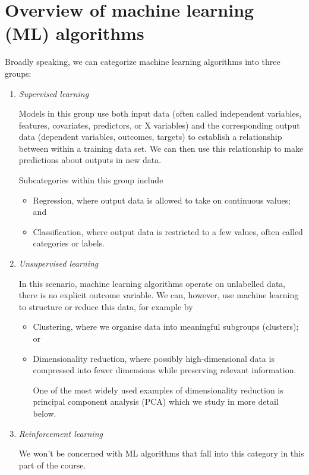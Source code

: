 \documentclass{scrartcl}
\providecommand{\tightlist}{%
      \setlength{\itemsep}{0pt}\setlength{\parskip}{0pt}}
\begin{document}
    
    \maketitle
    \tableofcontents
    
    

    
    \hypertarget{overview-of-machine-learning-ml-algorithms}{%
\section{Overview of machine learning (ML)
algorithms}\label{overview-of-machine-learning-ml-algorithms}}

Broadly speaking, we can categorize machine learning algorithms into
three groups:

\begin{enumerate}
\def\labelenumi{\arabic{enumi}.}
\item
  \emph{Supervised learning}

  Models in this group use both input data (often called independent
  variables, features, covariates, predictors, or X variables) and the
  corresponding output data (dependent variables, outcomes, targets) to
  establish a relationship between within a training data set. We can
  then use this relationship to make predictions about outputs in new
  data.

  Subcategories within this group include

  \begin{itemize}
  \tightlist
  \item
    Regression, where output data is allowed to take on continuous
    values; and
  \item
    Classification, where output data is restricted to a few values,
    often called categories or labels.
  \end{itemize}
\item
  \emph{Unsupervised learning}

  In this scenario, machine learning algorithms operate on unlabelled
  data, \ie there is no explicit outcome variable. We can, however,
  use machine learning to structure or reduce this data, for example by

  \begin{itemize}
  \item
    Clustering, where we organise data into meaningful subgroups
    (clusters); or
  \item
    Dimensionality reduction, where possibly high-dimensional data is
    compressed into fewer dimensions while preserving relevant
    information.

    One of the most widely used examples of dimensionality reduction is
    principal component analysis (PCA) which we study in more detail
    below.
  \end{itemize}
\item
  \emph{Reinforcement learning}

  We won't be concerned with ML algorithms that fall into this category
  in this part of the course.
\end{enumerate}
\end{document}
